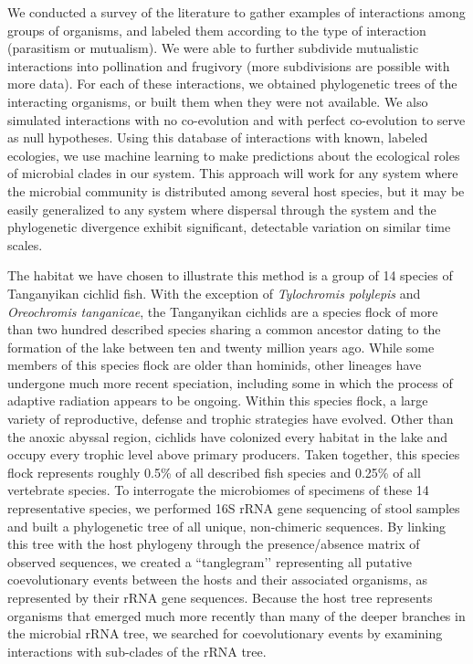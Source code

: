 We conducted a survey of the literature to gather examples of interactions among groups of organisms, and labeled them according to the type of interaction (parasitism or mutualism). We were able to further subdivide mutualistic interactions into pollination and frugivory (more subdivisions are possible with more data). For each of these interactions, we obtained phylogenetic trees of the interacting organisms, or built them when they were not available. We also simulated interactions with no co-evolution and with perfect co-evolution to serve as null hypotheses. Using this database of interactions with known, labeled ecologies, we use machine learning to make predictions about the ecological roles of microbial clades in our system. This approach will work for any system where the microbial community is distributed among several host species, but it may be easily generalized to any system where dispersal through the system and the phylogenetic divergence exhibit significant, detectable variation on similar time scales.

The habitat we have chosen to illustrate this method is a group of 14 species of Tanganyikan cichlid fish. With the exception of {\em Tylochromis polylepis} and {\em Oreochromis tanganicae}, the Tanganyikan cichlids are a species flock of more than two hundred described species sharing a common ancestor dating to the formation of the lake between ten and twenty million years ago. While some members of this species flock are older than hominids, other lineages have undergone much more recent speciation, including some in which the process of adaptive radiation appears to be ongoing. Within this species flock, a large variety of reproductive, defense and trophic strategies have evolved. Other than the anoxic abyssal region, cichlids have colonized every habitat in the lake and occupy every trophic level above primary producers. Taken together, this species flock represents roughly 0.5\% of all described fish species and 0.25\% of all vertebrate species. To interrogate the microbiomes of specimens of these 14 representative species, we performed 16S rRNA gene sequencing of stool samples and built a phylogenetic tree of all unique, non-chimeric sequences. By linking this tree with the host phylogeny through the presence/absence matrix of observed sequences, we created a ``tanglegram’’ representing all putative coevolutionary events between the hosts and their associated organisms, as represented by their rRNA gene sequences. Because the host tree represents organisms that emerged much more recently than many of the deeper branches in the microbial rRNA tree, we searched for coevolutionary events by examining interactions with sub-clades of the rRNA tree.